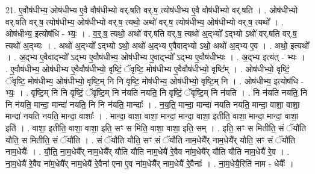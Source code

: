 \documentclass[17pt]{extarticle}
\begin{document}
21. ए॒वौष॑धीभ्य॒ ओष॑धीभ्य ए॒वै वौष॑धीभ्यो वर्.षति वर्.ष॒ त्योष॑धीभ्य ए॒वै वौष॑धीभ्यो वर्.षति । . ओष॑धीभ्यो वर्.षति वर्.ष॒ त्योष॑धीभ्य॒ ओष॑धीभ्यो वर्.ष॒ त्यथो॒ अथो॑ वर्.ष॒ त्योष॑धीभ्य॒ ओष॑धीभ्यो वर्.ष॒ त्यथो᳚ । . ओष॑धीभ्य॒ इत्योष॑धि - भ्यः॒ । . व॒र्॒.ष॒ त्यथो॒ अथो॑ वर्.षति वर्.ष॒ त्यथो॑ अ॒द्भ्यो᳚ ऽद्भ्यो ऽथो॑ वर्.षति वर्.ष॒ त्यथो॑ अ॒द्भ्यः । . अथो॑ अ॒द्भ्यो᳚ ऽद्भ्यो ऽथो॒ अथो॑ अ॒द्भ्य ए॒वैवाद्भ्यो ऽथो॒ अथो॑ अ॒द्भ्य ए॒व । . अथो॒ इत्यथो᳚ । . अ॒द्भ्य ए॒वैवाद्भ्यो᳚ ऽद्भ्य ए॒वौष॑धीभ्य॒ ओष॑धीभ्य ए॒वाद्भ्यो᳚ ऽद्भ्य ए॒वौष॑धीभ्यः । . अ॒द्भ्य इत्य॑त् - भ्यः । . ए॒वौष॑धीभ्य॒ ओष॑धीभ्य ए॒वैवौष॑धीभ्यो॒ वृष्टिं॒ ॅवृष्टि॒ मोष॑धीभ्य ए॒वैवौष॑धीभ्यो॒ वृष्टि᳚म् । . ओष॑धीभ्यो॒ वृष्टिं॒ ॅवृष्टि॒ मोष॑धीभ्य॒ ओष॑धीभ्यो॒ वृष्टि॒म् नि नि वृष्टि॒ मोष॑धीभ्य॒ ओष॑धीभ्यो॒ वृष्टि॒म् नि । . ओष॑धीभ्य॒ इत्योष॑धि - भ्यः॒ । . वृष्टि॒म् नि नि वृष्टिं॒ ॅवृष्टि॒म् नि न॑यति नयति॒ नि वृष्टिं॒ ॅवृष्टि॒म् नि न॑यति । . नि न॑यति नयति॒ नि नि न॑यति॒ मान्दा॒ मान्दा॑ नयति॒ नि नि न॑यति॒ मान्दाः᳚ । . न॒य॒ति॒ मान्दा॒ मान्दा॑ नयति नयति॒ मान्दा॒ वाशा॒ वाशा॒ मान्दा॑ नयति नयति॒ मान्दा॒ वाशाः᳚ । . मान्दा॒ वाशा॒ वाशा॒ मान्दा॒ मान्दा॒ वाशा॒ इतीति॒ वाशा॒ मान्दा॒ मान्दा॒ वाशा॒ इति॑ । . वाशा॒ इतीति॒ वाशा॒ वाशा॒ इति॒ सꣳ स मिति॒ वाशा॒ वाशा॒ इति॒ सम् । . इति॒ सꣳ स मितीति॒ सं ॅयौ॑ति यौति॒ स मितीति॒ सं ॅयौ॑ति । . सं ॅयौ॑ति यौति॒ सꣳ सं ॅयौ॑ति नाम॒धेयै᳚र् नाम॒धेयै᳚र् यौति॒ सꣳ सं ॅयौ॑ति नाम॒धेयैः᳚ । . यौ॒ति॒ ना॒म॒धेयै᳚र् नाम॒धेयै᳚र् यौति यौति नाम॒धेयै॑ रे॒वैव ना॑म॒धेयै᳚र् यौति यौति नाम॒धेयै॑ रे॒व । . ना॒म॒धेयै॑ रे॒वैव ना॑म॒धेयै᳚र् नाम॒धेयै॑ रे॒वैना॑ एना ए॒व ना॑म॒धेयै᳚र् नाम॒धेयै॑ रे॒वैनाः᳚ । . ना॒म॒धेयै॒रिति॑ नाम - धेयैः᳚ । \newline
\end{document}
